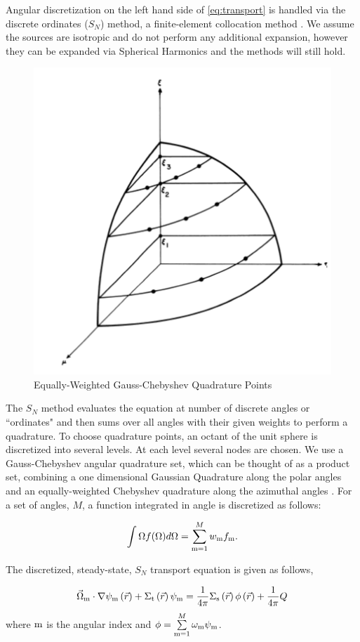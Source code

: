 Angular discretization on the left hand side of \eqref{eq:transport} is handled via the discrete ordinates ($S_N$) method, a finite-element collocation method \cite{Lathrop1965}. We assume the sources are isotropic and do not perform any additional expansion, however they can be expanded via Spherical Harmonics and the methods will still hold. 

\begin{figure}[H]
    \centering
    \includegraphics[width=.5\textwidth]{fig/SNPoints.png}
    \caption{Equally-Weighted Gauss-Chebyshev Quadrature Points \cite{Lathrop1965}}
    \label{fig:SN}
\end{figure}

The $S_N$ method evaluates the equation at number of discrete angles or ``ordinates" and then sums over all angles with their given weights to perform a quadrature. To choose quadrature points, an octant of the unit sphere is discretized into several levels. At each level several nodes are chosen. We use a Gauss-Chebyshev angular quadrature set, which can be thought of as a product set, combining a one dimensional Gaussian Quadrature along the polar angles and an equally-weighted Chebyshev quadrature along the azimuthal angles \cite{jarrel-thesis}. For a set of angles, $M$, a function integrated in angle is discretized as follows:

\begin{equation}
\int \Omega f(\Omega) d\Omega = \sum\limits_{\mathrm{m}=1}^{M} w_{\mathrm{m}} f_{\mathrm{m}}.    
\end{equation}






The discretized, steady-state, $S_N$ transport equation is given as follows,

 \begin{equation}
  \vec{\Omega}_{\mathrm{m}} \cdot \nabla \psi_{\mathrm{m}} \left(\vec{r}\right)+ \Sigma_{\mathrm{t}}\left(\vec{r}\right)\psi_{\mathrm{m}} = \frac{1}{4 \pi} \Sigma_{\mathrm{s}}\left(\vec{r}\right) \phi\left(\vec{r}\right) + \frac{1}{4 \pi} Q
  \label{eq:transport-angular}
 \end{equation}
where $\mathrm{m}$ is the angular index and $\phi = \sum\limits_{\mathrm{m}=1}^M \omega_{\mathrm{m}} \psi_{\mathrm{m}}$.

